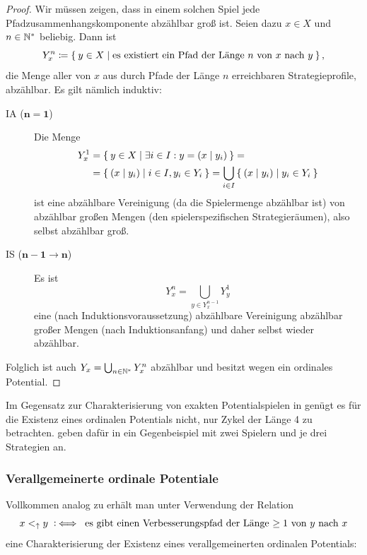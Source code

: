 \begin{proof}
	Wir müssen zeigen, dass in einem solchen Spiel jede Pfadzusammenhangskomponente abzählbar groß ist. Seien dazu $x \in X$ und $n \in \mathbb{N}^\ast$ beliebig. Dann ist
	\[Y_x^n \coloneqq \Set{y \in X | \text{es existiert ein Pfad der Länge $n$ von $x$ nach $y$}}, \]
	die Menge aller von $x$ aus durch Pfade der Länge $n$ erreichbaren Strategieprofile, abzählbar. Es gilt nämlich induktiv:
	\begin{description}
		\item[IA ($\bm{n=1}$)] Die Menge
		\begin{align*}
			Y_x^1 	&= \Set{y \in X | \exists i \in I: y = (x \mid y_i)} = \\
					&= \Set{(x \mid y_i) | i \in I, y_i \in Y_i } = \bigcup_{i \in I} \Set{(x \mid y_i) | y_i \in Y_i }
		\end{align*}
		ist eine abzählbare Vereinigung (da die Spielermenge abzählbar ist) von abzählbar großen Mengen (den spielerspezifischen Strategieräumen), also selbst abzählbar groß.
		\item[IS ($\bm{n-1 \to n}$)] Es ist
		\[Y_x^n = \bigcup_{y \in Y_x^{n-1}} Y_y^1\]
		eine (nach Induktionsvoraussetzung) abzählbare Vereinigung abzählbar großer Mengen (nach Induktionsanfang) und daher selbst wieder abzählbar.
	\end{description}
	Folglich ist auch $Y_x = \bigcup_{n\in\mathbb{N}^\ast} Y_x^n$ abzählbar und besitzt wegen  ein ordinales Potential.
\end{proof}

\begin{bem}
	Im Gegensatz zur Charakterisierung von exakten Potentialspielen in  genügt es für die Existenz eines ordinalen Potentials nicht, nur Zykel der Länge 4 zu betrachten. \citeauthor{CharExOrdPot} geben dafür in \cite[Beispiel 3.1]{CharExOrdPot} ein Gegenbeispiel mit zwei Spielern und je drei Strategien an.
\end{bem}


\subsubsection{Verallgemeinerte ordinale Potentiale}

Vollkommen analog zu  erhält man unter Verwendung der Relation
	\[x <_\uparrow y \mathbin{~\mathop:\!\!\iff} \text{ es gibt einen Verbesserungspfad der Länge $\geq 1$ von $y$ nach $x$}\]
eine Charakterisierung der Existenz eines verallgemeinerten ordinalen Potentials:

